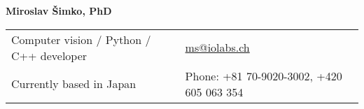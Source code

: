 \documentclass[a4paper,11pt,oneside]{article}
\begin{document}

\noindent  \LARGE{\textbf{Miroslav Šimko, PhD}}  \\
\vspace{-2ex}
\normalsize


\begin{center}
\begin{tabular}{l l}
 Computer vision / Python / C++ developer & \hspace{1in} \href{mailto:ms@iolabs.ch}{ms@iolabs.ch} \\
 Currently based in Japan & \hspace{1in} Phone: +81 70-9020-3002, +420 605 063 354 \\
\end{tabular}
\end{center}

\vspace{1em}

\end{document}
